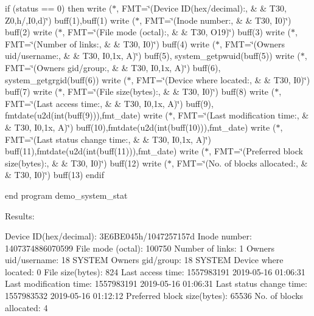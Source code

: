 if (status == 0) then write ($\ast$, F\+MT=\char`\"{}(\textquotesingle{}\+Device I\+D(hex/decimal)\+:\textquotesingle{},      \&
       \& T30, Z0,\textquotesingle{}h/\textquotesingle{},\+I0,\textquotesingle{}d\textquotesingle{})\char`\"{}) buff(1),buff(1) write ($\ast$, F\+MT=\char`\"{}(\textquotesingle{}\+Inode number\+:\textquotesingle{},                \&
       \& T30, I0)\char`\"{}) buff(2) write ($\ast$, F\+MT=\char`\"{}(\textquotesingle{}\+File mode (octal)\+:\textquotesingle{},           \&
       \& T30, O19)\char`\"{}) buff(3) write ($\ast$, F\+MT=\char`\"{}(\textquotesingle{}\+Number of links\+:\textquotesingle{},             \&
       \& T30, I0)\char`\"{}) buff(4) write ($\ast$, F\+MT=\char`\"{}(\textquotesingle{}\+Owner\textquotesingle{}\textquotesingle{}s uid/username\+:\textquotesingle{},       \&
       \& T30, I0,1x, A)\char`\"{}) buff(5), system\+\_\+getpwuid(buff(5)) write ($\ast$, F\+MT=\char`\"{}(\textquotesingle{}\+Owner\textquotesingle{}\textquotesingle{}s gid/group\+:\textquotesingle{},          \&
       \& T30, I0,1x, A)\char`\"{}) buff(6), system\+\_\+getgrgid(buff(6)) write ($\ast$, F\+MT=\char`\"{}(\textquotesingle{}\+Device where located\+:\textquotesingle{},        \&
       \& T30, I0)\char`\"{}) buff(7) write ($\ast$, F\+MT=\char`\"{}(\textquotesingle{}\+File size(bytes)\+:\textquotesingle{},            \&
       \& T30, I0)\char`\"{}) buff(8) write ($\ast$, F\+MT=\char`\"{}(\textquotesingle{}\+Last access time\+:\textquotesingle{},            \&
       \& T30, I0,1x, A)\char`\"{}) buff(9), fmtdate(u2d(int(buff(9))),fmt\+\_\+date) write ($\ast$, F\+MT=\char`\"{}(\textquotesingle{}\+Last modification time\+:\textquotesingle{},      \&
       \& T30, I0,1x, A)\char`\"{}) buff(10),fmtdate(u2d(int(buff(10))),fmt\+\_\+date) write ($\ast$, F\+MT=\char`\"{}(\textquotesingle{}\+Last status change time\+:\textquotesingle{},     \&
       \& T30, I0,1x, A)\char`\"{}) buff(11),fmtdate(u2d(int(buff(11))),fmt\+\_\+date) write ($\ast$, F\+MT=\char`\"{}(\textquotesingle{}\+Preferred block size(bytes)\+:\textquotesingle{}, \&
       \& T30, I0)\char`\"{}) buff(12) write ($\ast$, F\+MT=\char`\"{}(\textquotesingle{}\+No. of blocks allocated\+:\textquotesingle{},     \&
       \& T30, I0)\char`\"{}) buff(13) endif

end program demo\+\_\+system\+\_\+stat

Results\+:

Device ID(hex/decimal)\+: 3\+E6\+B\+E045h/1047257157d Inode number\+: 1407374886070599 File mode (octal)\+: 100750 Number of links\+: 1 Owner\textquotesingle{}s uid/username\+: 18 S\+Y\+S\+T\+EM Owner\textquotesingle{}s gid/group\+: 18 S\+Y\+S\+T\+EM Device where located\+: 0 File size(bytes)\+: 824 Last access time\+: 1557983191 2019-\/05-\/16 01\+:06\+:31 Last modification time\+: 1557983191 2019-\/05-\/16 01\+:06\+:31 Last status change time\+: 1557983532 2019-\/05-\/16 01\+:12\+:12 Preferred block size(bytes)\+: 65536 No. of blocks allocated\+: 4

